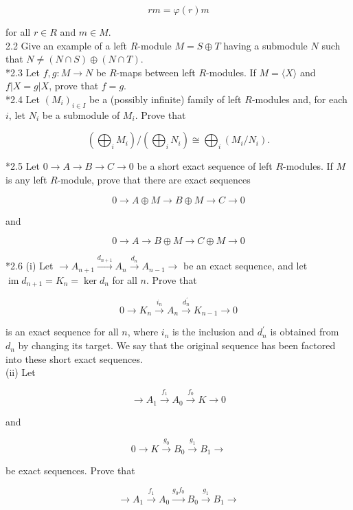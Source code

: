 \documentclass[10pt]{article}
\begin{document}
$$
r m=\varphi(r) m
$$

for all $r \in R$ and $m \in M$.\\
2.2 Give an example of a left $R$-module $M=S \oplus T$ having a submodule $N$ such that $N \neq(N \cap S) \oplus(N \cap T)$.\\
*2.3 Let $f, g: M \rightarrow N$ be $R$-maps between left $R$-modules. If $M=\langle X\rangle$ and $f|X=g| X$, prove that $f=g$.\\
*2.4 Let $\left(M_{i}\right)_{i \in I}$ be a (possibly infinite) family of left $R$-modules and, for each $i$, let $N_{i}$ be a submodule of $M_{i}$. Prove that

$$
\left(\bigoplus_{i} M_{i}\right) /\left(\bigoplus_{i} N_{i}\right) \cong \bigoplus_{i}\left(M_{i} / N_{i}\right) .
$$

*2.5 Let $0 \rightarrow A \rightarrow B \rightarrow C \rightarrow 0$ be a short exact sequence of left $R$-modules. If $M$ is any left $R$-module, prove that there are exact sequences

$$
0 \rightarrow A \oplus M \rightarrow B \oplus M \rightarrow C \rightarrow 0
$$

and

$$
0 \rightarrow A \rightarrow B \oplus M \rightarrow C \oplus M \rightarrow 0
$$

*2.6 (i) Let $\rightarrow A_{n+1} \xrightarrow{d_{n+1}} A_{n} \xrightarrow{d_{n}} A_{n-1} \rightarrow$ be an exact sequence, and let $\operatorname{im} d_{n+1}=K_{n}=\operatorname{ker} d_{n}$ for all $n$. Prove that

$$
0 \rightarrow K_{n} \xrightarrow{i_{n}} A_{n} \xrightarrow{d_{n}^{\prime}} K_{n-1} \rightarrow 0
$$

is an exact sequence for all $n$, where $i_{n}$ is the inclusion and $d_{n}^{\prime}$ is obtained from $d_{n}$ by changing its target. We say that the original sequence has been factored into these short exact sequences.\\
(ii) Let

$$
\rightarrow A_{1} \xrightarrow{f_{1}} A_{0} \xrightarrow{f_{0}} K \rightarrow 0
$$

and

$$
0 \rightarrow K \xrightarrow{g_{0}} B_{0} \xrightarrow{g_{1}} B_{1} \rightarrow
$$

be exact sequences. Prove that

$$
\rightarrow A_{1} \xrightarrow{f_{1}} A_{0} \xrightarrow{g_{0} f_{0}} B_{0} \xrightarrow{g_{1}} B_{1} \rightarrow
$$
\end{document}
